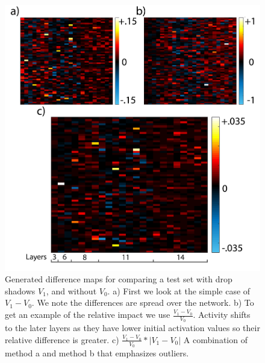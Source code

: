 \documentclass[10pt,twocolumn,letterpaper]{article}
\begin{document}
\begin{figure}
\includegraphics[width=\columnwidth]{Figures/diff_comparisons/diff_comparison-01.png}
\caption{Generated difference maps for comparing a test set  with drop shadows $V_1$, and without $V_0$. a) First we look at the simple case of $V_1-V_0$. We note the differences are spread over the network. b) To get an example of the relative impact we use $\frac{V_1-V_0}{V_0}$. Activity shifts to the later layers as they have lower initial activation values so their relative difference is greater. c) $\frac{V_1-V_0}{V_0}*|V_1-V_0|$ A combination of method a and method b that emphasizes outliers.}
\label{fig:diffmethods}
\end{figure}
\end{document}
